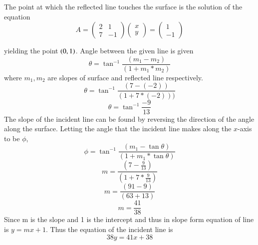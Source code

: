 The point at which the reflected line touches the surface is the solution of the equation
%
\begin{equation}
A = 
\begin{pmatrix}
2 &1 \\
 7 & -1
 \end{pmatrix}
  \begin{pmatrix}
x \\
  y
 \end{pmatrix}
=
 \begin{pmatrix}
1 \\
  -1
 \end{pmatrix}
\end{equation}
%  

%
\begin{equation}
\end{equation}
%
yielding the point $\left(0,1\right)$.
Angle   between   the   given   line   is   given   
\begin{equation}
\theta =\tan ^{ -1 }{ \frac { (m_1-m_2) }{ (1+m_1*m_2) }  } 
\end{equation} 
 where   $m_1, m_2$   are   slopes   of   surface   and   reflected   line   respectively.
\begin{equation}\theta =\tan ^{ -1 }{ \frac { (7-(-2)) }{ (1+7*(-2))) }  } 
 \end{equation} 
 \begin{equation}
 \theta =\tan ^{ -1 }{ \frac { -9 }{ 13 }  } 
  \end{equation}  
  The     slope     of     the     incident          line     can     be     found     by     reversing     the     direction     of     the     angle     along     the     surface. Letting the angle that the incident line makes along the $x$-axis to be $\phi$, 
  \begin{equation}
   \phi =\tan ^{ -1 }{ \frac { (m_1-\tan\theta ) }{ (1+m_1*\tan\theta ) }  } 
    \end{equation}
    \begin{equation}
        m=\frac { (7-\frac { 9 }{ 13 } ) }{ (1+7*\frac { 9 }{ 13 } ) } 
        \end{equation}
         \begin{equation}
         m=\frac { (91-9) }{ (63+13) }  \end{equation}
          \begin{equation} 
          m=\frac{41}{38 }
          \end{equation}
           Since     m     is     the     slope     and     1     is     the     intercept     and     thus     in     slope     form     equation     of     line     is     $y=mx+1$. Thus     the     equation     of     the     incident     line     is                                                                              
\begin{equation}
 38y=41x+38
\end{equation}           


